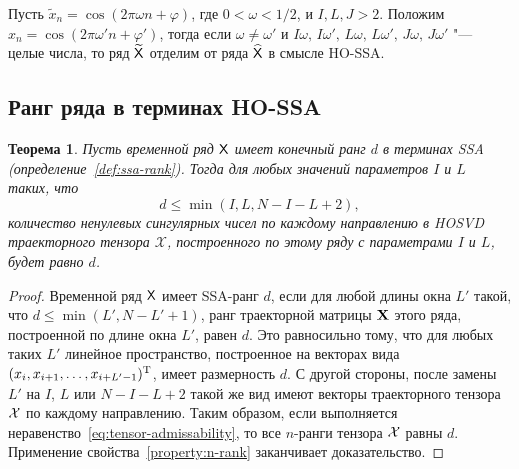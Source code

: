 \documentclass[specialist,
    substylefile = spbu.rtx,
    subf,href,colorlinks=true, 12pt]{disser}
\theoremstyle{plain}
\newtheorem{theorem}{Теорема}
\theoremstyle{definition}
\theoremstyle{remark}
\newtheorem*{remark}{Замечание}
\begin{document}
\begin{itemize}
        Пусть $\tilde{x}_n=\cos(2\pi \omega n + \varphi)$, где $0 < \omega < 1/2$, и $I, L, J > 2$.
        Положим \linebreak $\hat{x}_n=\cos(2\pi \omega' n + \varphi')$,
        тогда если $\omega\ne\omega'$ и $I\omega,\, I\omega',\, L\omega,\, L\omega',\, J\omega,\, J\omega'$
        "--- целые числа, то ряд $\widetilde{\mathsf{X}}$ отделим от ряда $\widehat{\mathsf{X}}$ в смысле HO-SSA.
    \end{itemize}


    \subsection{Ранг ряда в терминах HO-SSA}\label{subsec:tensor-ssa-rank}
    \begin{theorem}
        \label{state:tens-ssa-rank}
        Пусть временной ряд $\mathsf{X}$ имеет конечный ранг $d$ в терминах \emph{SSA} (определение~\ref{def:ssa-rank}).
        Тогда для любых значений параметров $I$ и $L$ таких, что
        \begin{equation}
            d\leqslant\min(I, L, N-I-L+2), \label{eq:tensor-admissability}
        \end{equation}
        количество ненулевых сингулярных чисел по каждому направлению в \emph{HOSVD} траекторного тензора $\mathcal{X}$,
        построенного по этому ряду с параметрами $I$ и $L$, будет равно $d$.
    \end{theorem}
    \begin{proof}
        Временной ряд $\mathsf{X}$ имеет SSA-ранг $d$, если для любой длины окна $L'$ такой, что
        $d \leqslant \min(L', N-L'+1)$,
        ранг траекторной матрицы $\mathbf{X}$ этого ряда, построенной по длине окна $L'$, равен $d$. 
        Это равносильно тому, что для любых таких $L'$ линейное пространство, построенное на векторах вида 
        $(x_i, x_{i+1}, \ldots, x_{i + L' - 1})^{\mathrm{T}}$, имеет размерность $d$.
        С другой стороны, после замены $L'$ на $I$, $L$ или $N-I-L+2$ такой же вид имеют векторы траекторного тензора $\mathcal{X}$ по каждому направлению.
        Таким образом, если выполняется неравенство~\eqref{eq:tensor-admissability}, то все $n$-ранги тензора
        $\mathcal{X}$ равны $d$.
        Применение свойства~\ref{property:n-rank} заканчивает доказательство.
    \end{proof}
\end{document}
